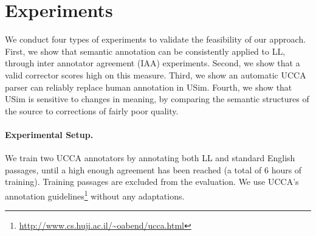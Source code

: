 \documentclass[a4paper, 11pt]{article}
\begin{document}
%
%
%
\vspace{-.2cm}
\section{Experiments}
\vspace{-.2cm}


We conduct four types of experiments to validate the feasibility of our approach.
First, we show that semantic annotation can be consistently applied to 
LL, through inter annotator agreement (IAA) experiments.
Second, we show that a valid corrector scores high on this measure.
Third, we show an automatic UCCA parser can reliably replace human annotation in {\sc USim}.
Fourth, we show that {\sc USim} is sensitive to changes in meaning, 
by comparing the semantic structures of the source to corrections of fairly poor quality.

\vspace{-.2cm}
\paragraph{Experimental Setup.}
We train two UCCA annotators by annotating both LL and standard English
passages, until a high enough agreement has been reached (a total of 6 hours of training).
Training passages are excluded from the evaluation.
We use UCCA's annotation
guidelines\footnote{\url{http://www.cs.huji.ac.il/~oabend/ucca.html}}
without any adaptations.
\end{document}
